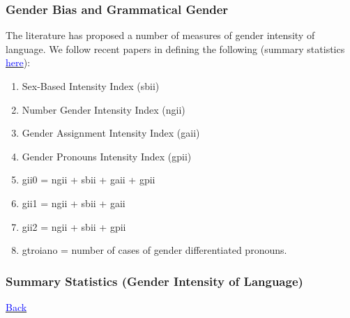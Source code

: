 \documentclass[10pt,letterpaper,subeqn]{beamer}
\begin{document}
\begin{frame}[label=GenderLanguage]
\frametitle{Gender Bias and Grammatical Gender}
The literature has proposed a number of measures of gender intensity of language.
We follow recent papers in defining the following (summary statistics \hyperlink{GenderLanguageSum}{\textcolor{blue}{here}}): \vspace{4mm}
\begin{enumerate}
\item Sex-Based Intensity Index (sbii) 
\item Number Gender Intensity Index (ngii)
\item Gender Assignment Intensity Index (gaii) 
\item Gender Pronouns Intensity Index (gpii) 
\item gii0 = ngii + sbii + gaii + gpii
\item gii1 = ngii + sbii + gaii
\item gii2 = ngii + sbii + gpii
\item gtroiano = number of cases of gender differentiated pronouns.
\end{enumerate}
\end{frame}

\begin{frame}[label=GenderLanguageSum]
\frametitle{Summary Statistics (Gender Intensity of Language)}
  \begin{table}[htbp]\centering 
\caption{Summary statistics \label{sumstat}}
\end{table}
\hyperlink{GenderLanguage}{\textcolor{blue}{Back}}
\end{frame}
\end{document}
